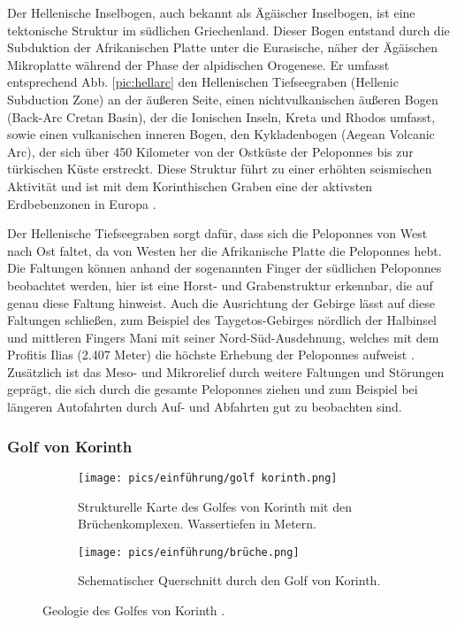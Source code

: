 \documentclass[preprint]{geomorphica} %
\begin{document}
Der Hellenische Inselbogen, auch bekannt als Ägäischer Inselbogen, ist eine tektonische Struktur im südlichen Griechenland. Dieser Bogen entstand durch die Subduktion der Afrikanischen Platte unter die Eurasische, näher der Ägäischen Mikroplatte während der Phase der alpidischen Orogenese. Er umfasst entsprechend Abb. \ref{pic:hellarc} den Hellenischen Tiefseegraben (Hellenic Subduction Zone) an der äußeren Seite, einen nichtvulkanischen äußeren Bogen (Back-Arc Cretan Basin), der die Ionischen Inseln, Kreta und Rhodos umfasst, sowie einen vulkanischen inneren Bogen, den Kykladenbogen (Aegean Volcanic Arc), der sich über 450 Kilometer von der Ostküste der Peloponnes bis zur türkischen Küste erstreckt. Diese Struktur führt zu einer erhöhten seismischen Aktivität und ist mit dem Korinthischen Graben eine der aktivsten Erdbebenzonen in Europa \cite{Armijo.Lyon-Caen.ea1992}.

Der Hellenische Tiefseegraben sorgt dafür, dass sich die Peloponnes von West nach Ost faltet, da von Westen her die Afrikanische Platte die Peloponnes hebt. Die Faltungen können anhand der sogenannten Finger der südlichen Peloponnes beobachtet werden, hier ist eine Horst- und Grabenstruktur erkennbar, die auf genau diese Faltung hinweist. Auch die Ausrichtung der Gebirge lässt auf diese Faltungen schließen, zum Beispiel des Taygetos-Gebirges nördlich der Halbinsel und mittleren Fingers Mani mit seiner Nord-Süd-Ausdehnung, welches mit dem Profitis Ilias (2.407 Meter) die höchste Erhebung der Peloponnes aufweist \cite{Armijo.Lyon-Caen.ea1992}. Zusätzlich ist das Meso- und Mikrorelief durch weitere Faltungen und Störungen geprägt, die sich durch die gesamte Peloponnes ziehen und zum Beispiel bei längeren Autofahrten durch Auf- und Abfahrten gut zu beobachten sind.

\subsubsection*{Golf von Korinth}
\label{sec:golfkorinth}

\begin{figure}[hp]
    \begin{subfigure}{\textwidth}
        \centering
        \texttt{[image: pics/einführung/golf korinth.png]} 
        \caption{Strukturelle Karte des Golfes von Korinth mit den Brüchenkomplexen. Wassertiefen in Metern.}
        \label{pic:golfkorinth}
    \end{subfigure}
    \begin{subfigure}{\textwidth}
        \centering
        \texttt{[image: pics/einführung/brüche.png]}
        \caption{Schematischer Querschnitt durch den Golf von Korinth.}
        \label{pic:brüche}
    \end{subfigure}
    \caption{Geologie des Golfes von Korinth \cite{morettiGulfCorinthActive2003}.}
\end{figure}
\end{document}
